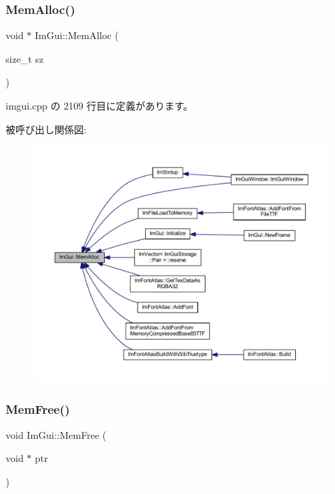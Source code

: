 \subsubsection{\texorpdfstring{Mem\+Alloc()}{MemAlloc()}}
{\footnotesize\ttfamily void $\ast$ Im\+Gui\+::\+Mem\+Alloc (\begin{DoxyParamCaption}\item[{size\+\_\+t}]{sz }\end{DoxyParamCaption})}



 imgui.\+cpp の 2109 行目に定義があります。

被呼び出し関係図\+:\nopagebreak
\begin{figure}[H]
\begin{center}
\leavevmode
\includegraphics[width=350pt]{namespace_im_gui_a15efb2cac4a54b35489c5984ba1b661a_icgraph}
\end{center}
\end{figure}
\mbox{\label{namespace_im_gui_a269ec695c6e722ec3da85dae37f0675d}} 
\subsubsection{\texorpdfstring{Mem\+Free()}{MemFree()}}
{\footnotesize\ttfamily void Im\+Gui\+::\+Mem\+Free (\begin{DoxyParamCaption}\item[{void $\ast$}]{ptr }\end{DoxyParamCaption})}



